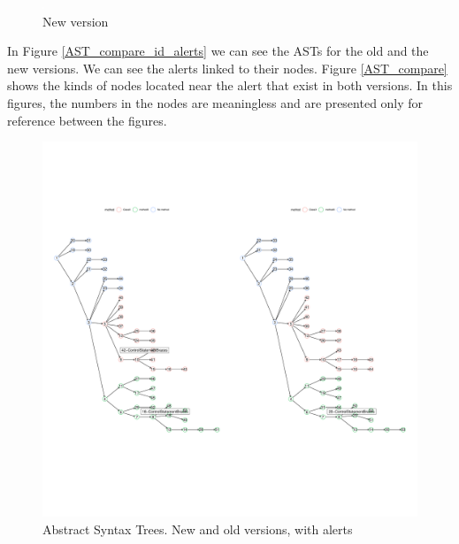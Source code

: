 \documentclass[
]{article}
\begin{document}
\normalsize

\begin{figure}
\centering
\includegraphics{figures/fake.png}
\caption{New version \label{new_simple_code}}
\end{figure}

In Figure \ref{AST_compare_id_alerts} we can see the ASTs for the old
and the new versions. We can see the alerts linked to their nodes. Figure
\ref{AST_compare} shows the kinds of nodes located near the alert that
exist in both versions. In this figures, the numbers in the nodes are
meaningless and are presented only for reference between the figures. 

%
%

\begin{figure}[H]
\includegraphics[width=1\linewidth]{report_files/figure-latex/unnamed-chunk-2-1} \caption{Abstract Syntax Trees. New and old versions, with alerts \label{AST_compare_id_alerts}}\label{fig:unnamed-chunk-2}
\end{figure}
\end{document}
